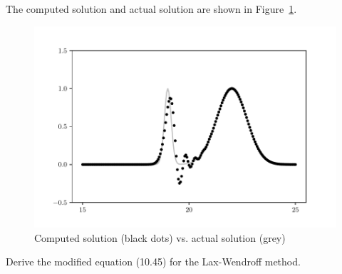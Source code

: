 \documentclass[10pt]{article}
\begin{document}
\begin{solution}[Solution]
\begin{enumerate}[label=(\alph*)]
    The computed solution and actual solution are shown in Figure~\ref{wave}.

    \begin{figure}[H]\centering
        \includegraphics[width=.8\textwidth]{wave.pdf}
    \caption{Computed solution (black dots) vs. actual solution (grey)}
    \label{wave}
    \end{figure}


\end{enumerate}

\end{solution}

\begin{problem}[Problem 3]
Derive the modified equation (10.45) for the Lax-Wendroff method.
\end{problem}
\end{document}
